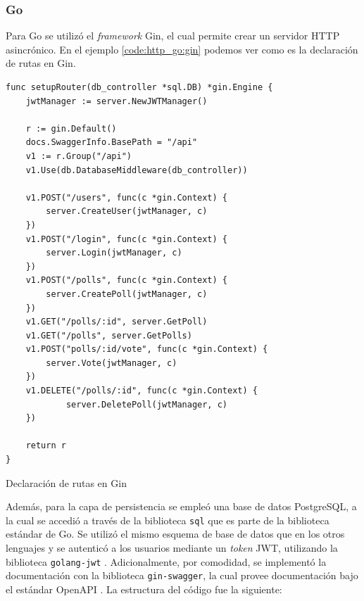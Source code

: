 \documentclass[11pt]{article}
\let\Oldsubsubsection\subsubsection
\renewcommand{\subsubsection}{\FloatBarrier\Oldsubsubsection}
\newcommand{\english}[1]{\textit{#1}}
\begin{document}
\subsubsection{Go}


Para Go se utilizó el \english{framework} Gin\cite{http:go:gin}, el cual permite crear un servidor HTTP asincrónico. En el ejemplo \ref{code:http_go:gin} podemos ver como es la declaración de rutas en Gin.

\begin{listing}
\begin{verbatim}
func setupRouter(db_controller *sql.DB) *gin.Engine {
	jwtManager := server.NewJWTManager()

	r := gin.Default()
	docs.SwaggerInfo.BasePath = "/api"
	v1 := r.Group("/api")
	v1.Use(db.DatabaseMiddleware(db_controller))
	
	v1.POST("/users", func(c *gin.Context) {
		server.CreateUser(jwtManager, c)
	})
	v1.POST("/login", func(c *gin.Context) {
		server.Login(jwtManager, c)
	})
	v1.POST("/polls", func(c *gin.Context) {
		server.CreatePoll(jwtManager, c)
	})
	v1.GET("/polls/:id", server.GetPoll)
	v1.GET("/polls", server.GetPolls)
	v1.POST("polls/:id/vote", func(c *gin.Context) {
		server.Vote(jwtManager, c)
	})
	v1.DELETE("/polls/:id", func(c *gin.Context) {
            server.DeletePoll(jwtManager, c)
	})

	return r
}
\end{verbatim}
\caption{Declaración de rutas en Gin}
\label{code:http_go:gin}
\end{listing}

Además, para la capa de persistencia se empleó una base de datos PostgreSQL, a la cual se accedió a través de la biblioteca \lstinline{sql} \cite{http:go:sql} que es parte de la biblioteca estándar de Go. Se utilizó el mismo esquema de base de datos que en los otros lenguajes y se autenticó a los usuarios mediante un \english{token} JWT, utilizando la biblioteca \lstinline{golang-jwt} \cite{http:go:jwt}. Adicionalmente, por comodidad, se implementó la documentación con la biblioteca \lstinline{gin-swagger}, la cual provee documentación bajo el estándar OpenAPI \cite{http:ex:openapi}. La estructura del código fue la siguiente:
\end{document}
